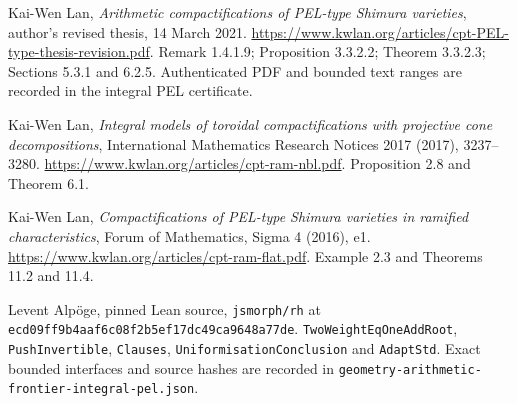 Kai-Wen Lan, \emph{Arithmetic compactifications of PEL-type Shimura
varieties}, author's revised thesis, 14 March 2021.
\url{https://www.kwlan.org/articles/cpt-PEL-type-thesis-revision.pdf}.
Remark 1.4.1.9; Proposition 3.3.2.2; Theorem 3.3.2.3;
Sections 5.3.1 and 6.2.5.  Authenticated PDF and bounded text ranges
are recorded in the integral PEL certificate.

Kai-Wen Lan, \emph{Integral models of toroidal compactifications with
projective cone decompositions}, International Mathematics Research
Notices 2017 (2017), 3237--3280.
\url{https://www.kwlan.org/articles/cpt-ram-nbl.pdf}.
Proposition 2.8 and Theorem 6.1.

Kai-Wen Lan, \emph{Compactifications of PEL-type Shimura varieties
in ramified characteristics}, Forum of Mathematics, Sigma 4 (2016), e1.
\url{https://www.kwlan.org/articles/cpt-ram-flat.pdf}.
Example 2.3 and Theorems 11.2 and 11.4.

Levent Alp\"oge, pinned Lean source, \texttt{jsmorph/rh} at
\texttt{ecd09ff9b4aaf6c08f2b5ef17dc49ca9648a77de}.
\texttt{TwoWeightEqOneAddRoot}, \texttt{PushInvertible},
\texttt{Clauses}, \texttt{UniformisationConclusion} and
\texttt{AdaptStd}.  Exact bounded interfaces and source hashes are
recorded in \texttt{geometry-arithmetic-frontier-integral-pel.json}.
